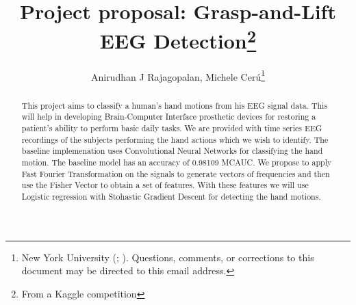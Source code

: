\documentclass[final,leqno,onefignum,onetabnum]{siamltexmm}
\title{Project proposal: Grasp-and-Lift EEG Detection\thanks{From a Kaggle competition}}
\author{Anirudhan J Rajagopalan, Michele Cer\'u\thanks{New York University (\email{ajr619@nyu.edu}; \email{mc3784@nyu.edu}). Questions, comments, or corrections
to this document may be directed to this email address.}}
\begin{document}
\maketitle
\newcommand{\slugmaster}{%
\slugger{siads}{xxxx}{xx}{x}{x---x}}%

\begin{abstract}
  This project aims to classify a human's hand motions from his EEG signal data.  This will help in developing Brain-Computer Interface prosthetic devices for restoring a patient's ability to perform basic daily tasks.
  We are provided with time series EEG recordings of the subjects performing the hand actions which we wish to identify.
  The baseline implemenation uses Convolutional Neural Networks for classifying the hand motion.  The baseline model has an accuracy of 0.98109 MCAUC\@.  
  We propose to apply Fast Fourier Transformation on the signals to generate vectors of frequencies and then use the Fisher Vector\cite{fisher} to obtain a set of features. 
  With these features we will use Logistic regression with Stohastic Gradient Descent for detecting the hand motions.
\end{abstract}

\pagestyle{myheadings}
\thispagestyle{plain}
\end{document}
